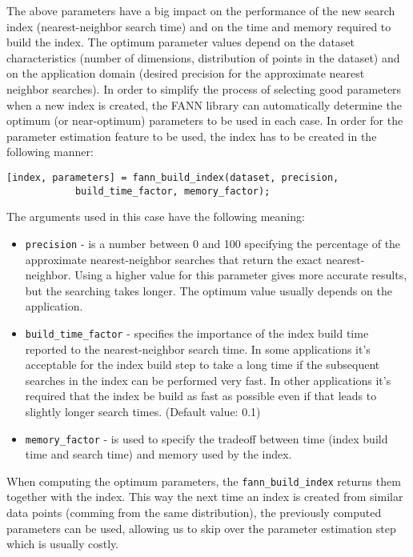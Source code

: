 \documentclass[letter,10pt]{article}
\begin{document}
The above parameters have a big impact on the performance of the new search index (nearest-neighbor search time) and on the time and memory required to build the index. The optimum parameter values depend on the dataset characteristics (number of dimensions, distribution of points in the dataset) and on the application domain (desired precision for the approximate nearest neighbor searches). In order to simplify the process of selecting good parameters when a new index is created, the FANN library can automatically determine the optimum (or near-optimum) parameters to 
be used in each case. In order for the parameter estimation feature to be used, the index has to be created in the following manner:
\begin{Verbatim}
[index, parameters] = fann_build_index(dataset, precision, 
			build_time_factor, memory_factor);
\end{Verbatim}
The arguments used in this case have the following meaning:
\begin{itemize}
\item \texttt{precision} - is a number between 0 and 100 specifying the percentage of the approximate nearest-neighbor searches that return the exact nearest-neighbor. Using a higher value for this parameter gives more accurate results, but the searching takes longer. The optimum value usually depends on the application.

\item \texttt{build\_time\_factor} - specifies the importance of the index build time reported to the nearest-neighbor search time. In some applications it's acceptable for the index build step to take a long time if the subsequent searches in the index can be performed very fast. In other applications it's required that the index be build as fast as possible even if that leads to slightly longer search times. (Default value: 0.1)

\item \texttt{memory\_factor} - is used to specify the tradeoff between time (index build time and search time) and memory used by the index.
\end{itemize}

When computing the optimum parameters, the \texttt{fann\_build\_index} returns them together with the index. This way the next time an index is created from similar data points (comming from the same distribution), the previously computed parameters can be used, allowing us to skip over the parameter estimation step which is usually costly.
\end{document}
